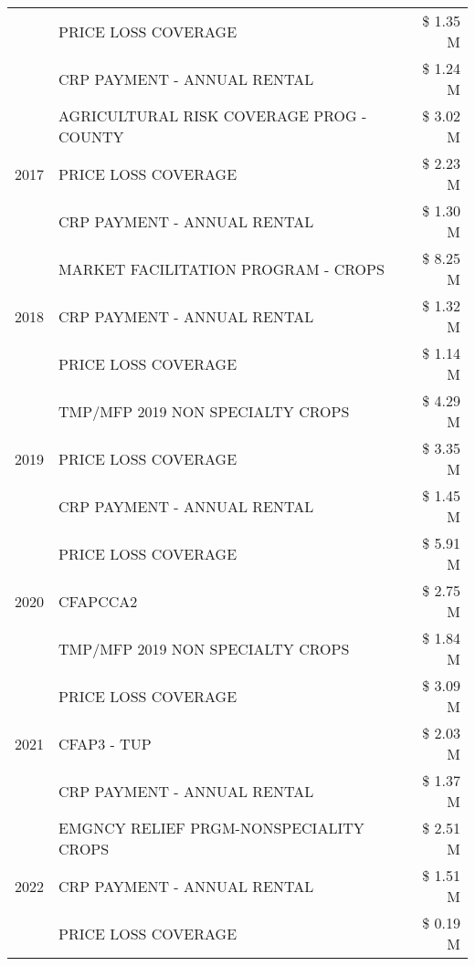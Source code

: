 \begin{tabular}{llr}
 & PRICE LOSS COVERAGE & \$ 1.35 M \\
 & CRP PAYMENT - ANNUAL RENTAL & \$ 1.24 M \\
\cline{1-3}
\multirow[t]{3}{*}{2017} & AGRICULTURAL RISK COVERAGE PROG - COUNTY & \$ 3.02 M \\
 & PRICE LOSS COVERAGE & \$ 2.23 M \\
 & CRP PAYMENT - ANNUAL RENTAL & \$ 1.30 M \\
\cline{1-3}
\multirow[t]{3}{*}{2018} & MARKET FACILITATION PROGRAM - CROPS & \$ 8.25 M \\
 & CRP PAYMENT - ANNUAL RENTAL & \$ 1.32 M \\
 & PRICE LOSS COVERAGE & \$ 1.14 M \\
\cline{1-3}
\multirow[t]{3}{*}{2019} & TMP/MFP 2019 NON SPECIALTY CROPS & \$ 4.29 M \\
 & PRICE LOSS COVERAGE & \$ 3.35 M \\
 & CRP PAYMENT - ANNUAL RENTAL & \$ 1.45 M \\
\cline{1-3}
\multirow[t]{3}{*}{2020} & PRICE LOSS COVERAGE & \$ 5.91 M \\
 & CFAPCCA2 & \$ 2.75 M \\
 & TMP/MFP 2019 NON SPECIALTY CROPS & \$ 1.84 M \\
\cline{1-3}
\multirow[t]{3}{*}{2021} & PRICE LOSS COVERAGE & \$ 3.09 M \\
 & CFAP3 - TUP & \$ 2.03 M \\
 & CRP PAYMENT - ANNUAL RENTAL & \$ 1.37 M \\
\cline{1-3}
\multirow[t]{3}{*}{2022} & EMGNCY RELIEF PRGM-NONSPECIALITY CROPS & \$ 2.51 M \\
 & CRP PAYMENT - ANNUAL RENTAL & \$ 1.51 M \\
 & PRICE LOSS COVERAGE & \$ 0.19 M \\
\cline{1-3}
\bottomrule
\end{tabular}
